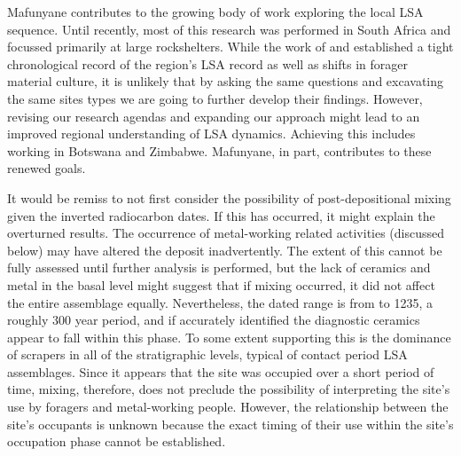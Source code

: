 \documentclass{ijsra}
\begin{document}

Mafunyane contributes to the  growing body of work exploring the local LSA sequence. 
Until recently, most of this research was performed in South Africa and focussed primarily at large rockshelters. 
While the work of \textcite{Hall_2000} and \textcites{vanDoornum_2007}{vanDoornum_2008}{vanDoornum_2014} established a tight chronological record of the region’s LSA record as well as shifts in forager material culture, it is unlikely that by asking the same questions and excavating the same sites types we are going to further develop their findings. However, revising our research agendas and expanding our approach might lead to an improved regional understanding of LSA dynamics. Achieving this includes working in Botswana and Zimbabwe. Mafunyane, in part, contributes to these renewed goals. 

It would be remiss to not first consider the possibility of post-depositional mixing given the inverted radiocarbon dates. If this has occurred, it might explain the overturned results. The occurrence of metal-working related activities (discussed below) may have altered the deposit inadvertently. The extent of this cannot be fully assessed until further analysis is performed, but the lack of ceramics and metal in the basal level might suggest that if mixing occurred, it did not affect the entire assemblage equally. Nevertheless, the dated range is from  to 1235, a roughly 300 year period, and if accurately identified the diagnostic ceramics appear to fall within this phase. To some extent supporting this is the dominance of scrapers in all of the stratigraphic levels, typical of contact period LSA assemblages. Since it appears that the site was occupied over a short period of time, mixing, therefore, does not preclude the possibility of interpreting the site’s use by foragers and metal-working people. However, the relationship between the site’s occupants is unknown because the exact timing of their use within the site’s occupation phase cannot be established. 
\end{document}
